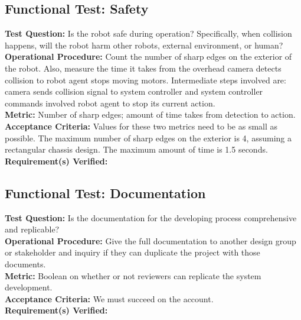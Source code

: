 \subsection{Functional Test: Safety}
\label{test:sys_ft_safety}
\textbf{Test Question:} Is the robot safe during operation? Specifically, when collision happens, will the robot harm other robots, external environment, or human?\\
\textbf{Operational Procedure:} Count the number of sharp edges on the exterior of the robot. Also, measure the time it takes from the overhead camera detects collision to robot agent stops moving motors. Intermediate steps involved are: camera sends collision signal to system controller and system controller commands involved robot agent to stop its current action. \\
\textbf{Metric:} Number of sharp edges; amount of time takes from detection to action.\\
\textbf{Acceptance Criteria:} Values for these two metrics need to be as small as possible. The maximum number of sharp edges on the exterior is 4, assuming a rectangular chassis design. The maximum amount of time is 1.5 seconds. \\
\textbf{Requirement(s) Verified:} 

\subsection{Functional Test: Documentation}
\label{test:sys_ft_Documentation}
\textbf{Test Question:} Is the documentation for the developing process comprehensive and replicable?\\
\textbf{Operational Procedure:} Give the full documentation to another design group or stakeholder and inquiry if they can duplicate the project with those documents.\\
\textbf{Metric:} Boolean on whether or not reviewers can replicate the system development.\\
\textbf{Acceptance Criteria:} We must succeed on the account.\\
\textbf{Requirement(s) Verified:} 

